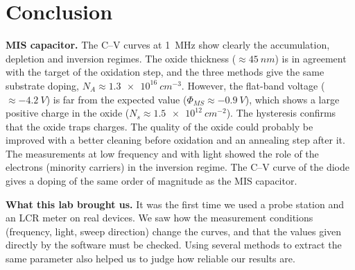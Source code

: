 \section{Conclusion}\label{sec:conclusion}


\textbf{MIS capacitor.} The C--V curves at \SI{1}{MHz} show clearly the accumulation, depletion and
inversion regimes. The oxide thickness ($\approx\SI{45}{nm}$) is in agreement with the target of the
oxidation step, and the three methods give the same substrate doping, $N_A\approx\SI{1.3e16}{cm^{-3}}$.
However, the flat-band voltage ($\approx\SI{-4.2}{V}$) is far from the expected value
($\Phi_{MS}\approx\SI{-0.9}{V}$), which shows a large positive charge in the oxide
($N_s\approx\SI{1.5e12}{cm^{-2}}$). The hysteresis confirms that the oxide traps charges. The quality of
the oxide could probably be improved with a better cleaning before oxidation and an annealing step
after it. The measurements at low frequency and with light showed the role of the electrons
(minority carriers) in the inversion regime. The C--V curve of the diode gives a doping of the same
order of magnitude as the MIS capacitor.

\textbf{What this lab brought us.}  It was the first time we used a probe station and
an LCR meter on real devices. We saw how the measurement conditions (frequency, light, sweep direction)
change the curves, and that the values given directly by the software must be checked. Using several
methods to extract the same parameter also helped us to judge how reliable our results are.
